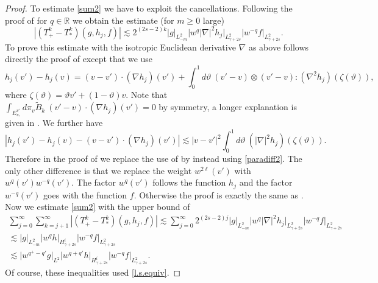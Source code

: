 \documentclass{amsart}
\numberwithin{equation}{section}
\begin{document}
\begin{proof}
To estimate \eqref{sum2} we have to exploit the cancellations.   Following the proof of \cite[Proposition 3.7]{gsNonCut0} for ${q} \in {\mathbb{R}}$ we obtain the estimate (for $m \ge 0$ large)
$$
\left| ({T^{k}_{+}} - {T^{k}_{*}})(g,h_j,f) \right|
\lesssim 2^{(2s-2)k} {|} g{|}_{L^2_{-m}} 
{|}  w^{q} \left| \nabla \right|^2 h_j {|}_{L^2_{\gamma+2s}}
{|} w^{-{q}} f{|}_{L^2_{\gamma+2s}}.  
$$
To prove this estimate with the isotropic Euclidean derivative ${\nabla}$ as above follows directly the proof of \cite[Proposition 3.7]{gsNonCut0} except that we use 
$$
h_j(v')-h_j(v)=(v-v')\cdot({\nabla} h_j)(v')+\int_0^1 d {\vartheta} ~
(v'-v)\otimes(v'-v):({\nabla}^2 h_j)({\zeta}({\vartheta})), 
$$
where ${\zeta}({\vartheta})={\vartheta} v'+(1-{\vartheta})v$.  Note that 
$
\int_{E_{v_*}^{v'}} d \pi_{v} \tilde{B}_k ~ (v'-v)\cdot({\nabla} h_j)(v')
=0
$
by symmetry, a longer explanation is given in \cite[(3.41)]{gsNonCut0}.  We further have
\begin{equation}
\left| h_j(v')-h_j(v)-(v-v')\cdot({\nabla} h_j)(v')\right| 
 \lesssim |v-v'|^2 \int_0^1 d {\vartheta}  ~ (| \nabla|^2 h_j) ({\zeta}({\vartheta})). 
\label{paradiff2}
\end{equation}
Therefore in the proof of \cite[Proposition 3.7]{gsNonCut0}
we replace the use of \cite[(3.25)]{gsNonCut0} by instead using \eqref{paradiff2}.
The only other difference is that we replace the weight $w^{2\ell}(v')$ with $w^{q}(v')w^{-{q}}(v')$.  The factor $w^{q}(v')$ follows the function $h_j$ and the factor $w^{-{q}}(v')$ goes with the function $f$.  Otherwise the proof is exactly the same as \cite[Proposition 3.7]{gsNonCut0}.   Now we estimate \eqref{sum2} with the upper bound of
\begin{gather*}
\sum_{j=0}^\infty \sum_{k=j+1}^\infty  \left| ({T^{k}_{+}} - {T^{k}_{*}})(g,h_j,f) \right|
\lesssim  
\sum_{j=0}^\infty
 2^{(2s-2)j} {|} g{|}_{L^2_{-m}} 
{|}  w^{q} \left| \nabla \right|^2 h_j {|}_{L^2_{\gamma+2s}}
{|} w^{-{q}} f{|}_{L^2_{\gamma+2s}}
\\
\lesssim  
 {|}   g{|}_{L^2_{-m}} 
{|} w^{q} h{|}_{H^{i}_{\gamma + 2s}} 
{|} w^{-{q}} f{|}_{L^2_{\gamma + 2s}}
\\
\lesssim  
 {|}  w^{{q}^+ - {q}'} g{|}_{L^2} 
{|} w^{{q} + {q}'} h{|}_{H^{i}_{\gamma + 2s}} 
{|} w^{-{q}} f{|}_{L^2_{\gamma + 2s}}.
\end{gather*}
Of course, these inequalities used \eqref{l.s.equiv}.


\end{proof}
\end{document}
